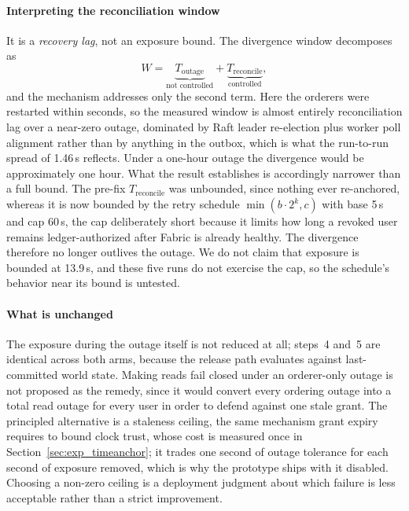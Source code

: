 \documentclass[preprint,12pt]{elsarticle}
\begin{document}
\paragraph{Interpreting the reconciliation window}
It is a \emph{recovery lag}, not an exposure bound. The divergence window
decomposes as
\begin{equation}
  W = \underbrace{T_{\text{outage}}}_{\text{not controlled}}
    + \underbrace{T_{\text{reconcile}}}_{\text{controlled}},
  \label{eq:divergence_window}
\end{equation}
and the mechanism addresses only the second term. Here the orderers were
restarted within seconds, so the measured window is almost entirely
reconciliation lag over a near-zero outage, dominated by Raft leader
re-election plus worker poll alignment rather than by anything in the outbox,
which is what the run-to-run spread of 1.46\,s reflects. Under a one-hour outage the divergence would be
approximately one hour. What the result establishes is accordingly narrower
than a full bound. The pre-fix $T_{\text{reconcile}}$ was unbounded, since
nothing ever re-anchored, whereas it is now bounded by the retry schedule
$\min(b \cdot 2^{k}, c)$ with base 5\,s and cap 60\,s, the cap deliberately
short because it limits how long a revoked user remains ledger-authorized after
Fabric is already healthy. The divergence therefore no longer outlives the
outage. We do not claim that exposure is bounded at 13.9\,s, and these five
runs do not exercise the cap, so the schedule's behavior near its bound is
untested.

\paragraph{What is unchanged}
The exposure during the outage itself is not reduced at all; steps~4 and~5
are identical across both arms, because the release path evaluates against
last-committed world state. Making reads fail closed under an orderer-only
outage is not proposed as the remedy, since it would convert every ordering
outage into a total read outage for every user in order to defend against one
stale grant. The principled alternative is a staleness ceiling, the same
mechanism grant expiry requires to bound clock trust, whose cost is measured
once in Section~\ref{sec:exp_timeanchor}; it trades one second of outage
tolerance for each second of exposure removed, which is why the prototype
ships with it disabled. Choosing a non-zero ceiling is a deployment judgment
about which failure is less acceptable rather than a strict improvement.
\end{document}

